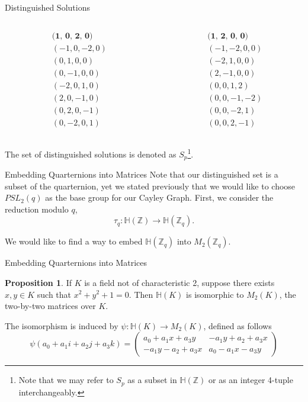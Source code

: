 \documentclass[10pt]{beamer}
\theoremstyle{definition}\newtheorem{proposition}{Proposition}
\begin{document}
\begin{frame}{Distinguished Solutions}
\begin{columns}
\begin{column}{0.10\textwidth}
\begin{align*}
&\textbf{(1, 0, 2, 0)}\\
&(-1, 0, -2, 0)\\
&(0, 1, 0, 0)\\
&(0, -1, 0, 0)\\
&(-2, 0, 1, 0)\\
&(2, 0, -1, 0)\\
&(0, 2, 0, -1)\\
&(0, -2, 0, 1)
\end{align*}
\end{column}

\begin{column}{0.10\textwidth}
\begin{align*}
&\textbf{(1, 2, 0, 0)}\\
&(-1, -2, 0, 0)\\
&(-2, 1, 0, 0)\\
&(2, -1, 0, 0)\\
&(0, 0, 1, 2)\\
&(0, 0, -1, -2)\\
&(0, 0, -2, 1)\\
&(0, 0, 2, -1)
\end{align*}
\end{column}
\end{columns}
\normalsize
The set of distinguished solutions is denoted as $S_p$\footnote{Note that we may refer to $S_p$ as a subset in $\mathbb{H}(\mathbb{Z})$ or as an integer 4-tuple interchangeably.}.
\end{frame}

\begin{frame}{Embedding Quarternions into Matrices}
Note that our distinguished set is a subset of the quarternion, yet we stated previously that we would like to choose $PSL_2(q)$ as the base group for our Cayley Graph.
\pause
First, we consider the reduction modulo $q$,
\[\tau_q : \mathbb{H}(\mathbb{Z}) \rightarrow \mathbb{H}(\mathbb{Z}_q).\]

We would like to find a way to embed $\mathbb{H}(\mathbb{Z}_q)$ into $M_2(\mathbb{Z}_q)$. 
\end{frame}

\begin{frame}{Embedding Quarternions into Matrices}
\begin{proposition}
If $K$ is a field not of characteristic 2, suppose there exists $x,y \in K$ such that $x^2 + y^2 + 1 = 0$. Then $\mathbb{H}(K)$ is isomorphic to $M_2(K)$, the two-by-two matrices over $K$.
\end{proposition}
\pause
The isomorphism is induced by $\psi: \mathbb{H}(K) \rightarrow M_2(K)$, defined as follows
\[\psi(a_0 + a_1i + a_2j + a_3k) = \begin{pmatrix}
a_0 + a_1x + a_3y & -a_1y + a_2 + a_3x \\
-a_1y - a_2 + a_3x & a_0 - a_1x - a_3y
\end{pmatrix}\]
\end{frame}
\end{document}
